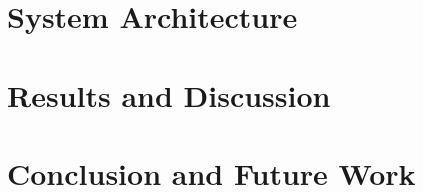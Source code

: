 \documentclass[11pt,twoside,openany]{book}
\begin{document}
\chapter{System Architecture}


\chapter{Results and Discussion}


\chapter{Conclusion and Future Work}


\backmatter



\end{document}
